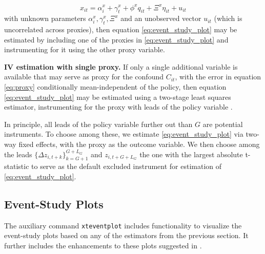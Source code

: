 \documentclass[bib]{./sty/statapress}
\begin{document}
\begin{equation}\label{eq:proxy}
  x_{it} = \alpha_i^x + \gamma_t^x + \phi^x q_{it} + \Xi^x \eta_{it} + u_{it}
\end{equation}
with unknown parameters $\alpha_i^x, \gamma_t^x, \Xi^x$ and an unobserved vector $u_{it}$ (which is uncorrelated across proxies), then equation \eqref{eq:event_study_plot} may be estimated by including one of the proxies in \eqref{eq:event_study_plot} and instrumenting for it using the other proxy variable.

\noindent \textbf{IV estimation with single proxy.}
If only a single additional variable is available that may serve as proxy for the confound $C_{it}$, with the error in equation \eqref{eq:proxy} conditionally mean-independent of the policy, then equation \eqref{eq:event_study_plot} may be estimated using a two-stage least squares estimator, instrumenting for the proxy with leads of the policy variable \citep{freyaldenhoven2019pre}.

In principle, all leads of the policy variable further out than $G$ are potential instruments.
To choose among these, we estimate \eqref{eq:event_study_plot} via two-way fixed effects, with the proxy as the outcome variable.
We then choose among the leads $\{\Delta z_{i,t+k}\}_{k=G+1}^{G+L_G}$ and $z_{i,t+G+L_G}$ the one with the largest absolute t-statistic to serve as the default excluded instrument for estimation of \eqref{eq:event_study_plot}.


\subsection{Event-Study Plots}
\label{subsec:plots}

The auxiliary command \texttt{xteventplot} includes functionality to visualize the event-study plots based on any of the estimators from the previous section.
It further includes the enhancements to these plots suggested in \cite{freyaldenhoven2021visualization}.
\end{document}
